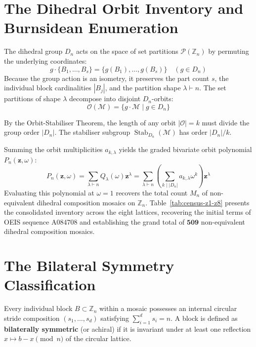 \section{The Dihedral Orbit Inventory and Burnsidean Enumeration}

The dihedral group $D_n$ acts on the space of set partitions $\mathcal{P}(\mathbb{Z}_n)$ by permuting the underlying coordinates:
\begin{equation}
g \cdot \{B_1, \dots, B_s\} = \{g(B_1), \dots, g(B_s)\} \quad (g \in D_n)
\end{equation}
Because the group action is an isometry, it preserves the part count $s$, the individual block cardinalities $|B_j|$, and the partition shape $\lambda \vdash n$. The set partitions of shape $\lambda$ decompose into disjoint $D_n$-orbits:
\begin{equation}
\mathcal{O}(\mathcal{M}) = \{g \cdot \mathcal{M} \mid g \in D_n\}
\end{equation}

By the Orbit-Stabiliser Theorem, the length of any orbit $|\mathcal{O}| = k$ must divide the group order $|D_n|$. The stabiliser subgroup $\operatorname{Stab}_{D_n}(\mathcal{M})$ has order $|D_n| / k$.

Summing the orbit multiplicities $a_{k,\lambda}$ yields the graded bivariate orbit polynomial $P_n(\mathbf{z}, \omega)$:
\begin{equation}
P_n(\mathbf{z}, \omega) = \sum_{\lambda \vdash n} Q_\lambda(\omega) \mathbf{z}^\lambda = \sum_{\lambda \vdash n} \left( \sum_{k \mid |D_n|} a_{k,\lambda} \omega^k \right) \mathbf{z}^\lambda
\end{equation}
Evaluating this polynomial at $\omega = 1$ recovers the total count $M_n$ of non-equivalent dihedral composition mosaics on $\mathbb{Z}_n$. Table~\ref{tab:census-z1-z8} presents the consolidated inventory across the eight lattices, recovering the initial terms of OEIS sequence A084708 and establishing the grand total of $\mathbf{509}$ non-equivalent dihedral composition mosaics.



\section{The Bilateral Symmetry Classification}

Every individual block $B \subset \mathbb{Z}_n$ within a mosaic possesses an internal circular stride composition $(s_1, \dots, s_d)$ satisfying $\sum_{i=1}^d s_i = n$. A block is defined as \textbf{bilaterally symmetric} (or achiral) if it is invariant under at least one reflection $x \mapsto b - x \pmod n$ of the circular lattice. 


